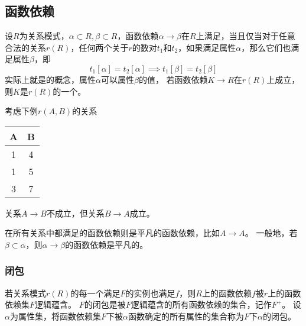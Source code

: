 \subsection{函数依赖}
\begin{definition}
设$R$为关系模式，$\alpha\subset R,\beta\subset R$，函数依赖$\alpha\to\beta$在$R$上满足，当且仅当对于任意合法的关系$r(R)$，任何两个关于$r$的数对$t_1$和$t_2$，如果满足属性$\alpha$，那么它们也满足属性$\beta$，即
\[t_1[\alpha]=t_2[\alpha]\implies t_1[\beta]=t_2[\beta]\]
实际上就是的概念，属性$\alpha$可以属性$\beta$的值，
若函数依赖$K\to R$在$r(R)$上成立，则$K$是$r(R)$的一个。
\end{definition}
\begin{example}
考虑下例$r(A,B)$的关系
\begin{center}
\begin{tabular}{|c|c|}\hline
A & B\\\hline
1 & 4\\\hline
1 & 5\\\hline
3 & 7\\\hline
\end{tabular}
\end{center}
关系$A\to B$不成立，但关系$B\to A$成立。
\end{example}

\begin{definition}[平凡]
在所有关系中都满足的函数依赖则是平凡的函数依赖，比如$A\to A$。
一般地，若$\beta\subset\alpha$，则$\alpha\to\beta$的函数依赖是平凡的。
\end{definition}

\subsubsection{闭包}
\begin{definition}[逻辑蕴含与闭包]
若关系模式$r(R)$的每一个满足$F$的实例也满足$f$，则$R$上的函数依赖$f$被$r$上的函数依赖集$F$逻辑蕴含。
$F$的闭包是被$F$逻辑蕴含的所有函数依赖的集合，记作$F^+$。
设$\alpha$为属性集，将函数依赖集$F$下被$\alpha$函数确定的所有属性的集合称为$F$下$\alpha$的闭包。
\end{definition}

